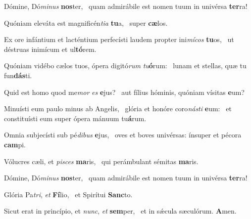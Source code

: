 \item Dómine, Dó\textit{minus} \textbf{nos}ter,~\psstar{} quam admirábile est nomen tuum in univérsa \textbf{ter}ra!
\item Quóniam eleváta est magnificén\textit{tia} \textbf{tu}a,~\psstar{} super \textbf{cæ}los.
\item Ex ore infántium et lacténtium perfecísti laudem propter ini\textit{mícos} \textbf{tu}os,~\psstar{} ut déstruas inimícum et ul\textbf{tó}rem.
\item Quóniam vidébo cælos tuos, ópera digitó\textit{rum} \textit{tu}\textbf{ó}rum:~\psstar{} lunam et stellas, quæ tu fun\textbf{dás}ti.
\item Quid est homo quod me\textit{mor} \textit{es} \textbf{e}jus?~\psstar{} aut fílius hóminis, quóniam vísitas \textbf{e}um?
\item Minuísti eum paulo minus ab Angelis,~\pscross{} glória et honóre coro\textit{násti} \textbf{e}um:~\psstar{} et constituísti eum super ópera mánuum tu\textbf{á}rum.
\item Omnia subjecísti sub pé\textit{dibus} \textbf{e}jus,~\psstar{} oves et boves univérsas: ínsuper et pécora \textbf{cam}pi.
\item Vólucres cæli, et \textit{pisces} \textbf{ma}ris,~\psstar{} qui perámbulant sémitas \textbf{ma}ris.
\item Dómine, Dó\textit{minus} \textbf{nos}ter,~\psstar{} quam admirábile est nomen tuum in univérsa \textbf{ter}ra!
\item Glória Pa\textit{tri}, \textit{et} \textbf{Fí}lio,~\psstar{} et Spirítui \textbf{Sanc}to.
\item Sicut erat in princípio, et \textit{nunc}, \textit{et} \textbf{sem}per,~\psstar{} et in sǽcula sæculórum. \textbf{A}men.
